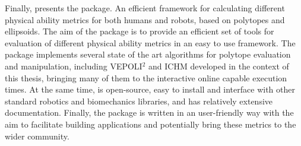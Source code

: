 

Finally,  presents the  package.  An efficient framework for calculating different physical ability metrics for both humans and robots, based on polytopes and ellipsoids. The aim of the package is to provide an efficient set of tools for evaluation of different physical ability metrics in an easy to use framework. The package implements several state of the art algorithms for polytope evaluation and manipulation, including VEPOLI$^2$ and ICHM developed in the context of this thesis, bringing many of them to the interactive online capable execution times. At the same time,  is open-source, easy to install and interface with other standard robotics and biomechanics libraries, and has relatively extensive documentation. Finally, the package is written in an user-friendly way with the aim to facilitate building applications and potentially bring these metrics to the wider community.



